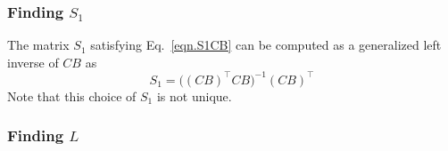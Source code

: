 \documentclass[]{../sty/JGCD}
\theoremstyle{examplestyle}
\begin{document}
  \subsubsection{Finding $S_{1}$}

  The matrix $S_{1}$ satisfying Eq.\ \eqref{eqn.S1CB} can be computed as a generalized left inverse of $CB$ as
  \begin{equation}
    \label{eqn.S1}
    S_{1}=\bigr((CB)^{\top}CB\bigr)^{-1}(CB)^{\top}
  \end{equation}
  Note that this choice of $S_{1}$ is not unique.

  \subsubsection{Finding $L$}\label{subsection.obtainX}
\end{document}
